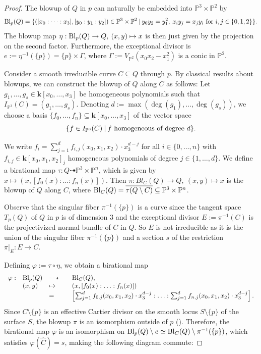 \documentclass[english,11pt,reqno]{amsart}
\newcommand{\sub}{\subseteq}
\newcommand{\Ptwo}{\mathbb{P}^2}
\newcommand{\Pthree}{\mathbb{P}^3}
\newcommand{\Pn}{\mathbb{P}^n}
\newcommand{\VPtwo}{V_{\Ptwo}}
\newcommand{\kk}{\mathbf{k}}
\newcommand{\kPthree}{\kk[x_0,\dots,x_3]}
\newcommand{\Bl}{\textup{Bl}}
\begin{document}
%
%
\begin{proof} The blowup of $Q$ in $p$ can naturally be embedded into $\Pthree \times \Ptwo$ by 
$$ \Bl_p(Q)=\{([x_0:\dots:x_3], [y_0:y_1:y_2])\in \Pthree \times \Ptwo \:|\: y_0y_2=y_1^2, \: x_iy_j=x_jy_i \textup{ for } i,j\in\{0,1,2\}\}.$$
The blowup map $\eta:\Bl_p(Q)\rightarrow Q,\: (x,y)\mapsto x$ is then just given by the projection on the second factor. Furthermore, the exceptional divisor is $e:=\eta^{-1}(\{p\})=\{p\} \times \Gamma$, where $\Gamma:=\VPtwo(x_0x_2-x_1^2)$ is a conic in $\Ptwo$.\par 
Consider a smooth irreducible curve $C\sub Q$ through $p$. By classical results about blowups, we can construct the blowup of $Q$ along $C$ as follows: Let $g_1,\dots, g_s \in \kPthree$ be homogeneous polynomials such that $I_{\Pthree}(C)=(g_1,\dots,g_s)$. Denoting $d:=\max(\deg(g_1),\dots,\deg(g_s))$, we choose a basis $\{f_0,\dots, f_n\}\sub\kPthree$ of the vector space $$\{f\in I_{\Pthree}(C) \:|\: f \textup{ homogeneous of degree } d\}.$$ \par 
We write $f_i=\sum_{j=1}^d f_{i,j}(x_0,x_1,x_2) \cdot x_3^{d-j}$ for all $i\in\{0,\dots,n\}$ with $f_{i,j}\in \kk[x_0,x_1,x_2]_j$ homogeneous polynomials of degree $j\in \{1,\dots,d\}$. We define a birational map $\tau: Q \dashrightarrow \Pthree \times \Pn$, which is given by
$x \mapsto (x,[f_0(x):{\dots }:f_n(x)]).$
Then $\pi:Bl_C(Q)\rightarrow Q, \:(x,y)\mapsto x$ is the blowup of $Q$ along $C$, where $\Bl_C(Q)= \overline{\tau(Q\setminus C)}\sub \Pthree\times \Pn$.\par 
Observe that the singular fiber $\pi^{-1}(\{p\})$ is a curve since the tangent space $T_p(Q)$ of $Q$ in $p$ is of dimension 3 and the exceptional divisor $E:=\pi^{-1}(C)$ is the projectivized normal bundle of $C$ in $Q$.
So $E$ is not irreducible as it is the union of the singular fiber $\pi^{-1}(\{p\})$ and a section $s$ of the restriction $\pi|_{E}:E \rightarrow C$. \par 
Defining $\varphi:= \tau \circ \eta$, we obtain a birational map
$$ \begin{array}{l l l l l}
\varphi:&\Bl_p(Q)&\dashrightarrow &&\Bl_C(Q), \\ 
&(x,y) &\mapsto &&(x,[f_0(x):{\dots}: f_n(x)])\\
& & =& & \left[\sum_{j=1}^d f_{0,j}(x_0,x_1,x_2)\cdot x_3^{d-j}: {\dots}: \sum_{j=1}^d f_{n,j}(x_0,x_1,x_2)\cdot x_3^{d-j} \right].
\end{array}$$ 
Since $C\setminus \{p\}$ is an effective Cartier divisor on the smooth locus $S\setminus \{p\}$ of the surface $S$, the blowup $\pi$ is an isomorphism outside of $p$ (). Therefore, the birational map $\varphi$ is an isomorphism on $\Bl_p(Q)\setminus e \simeq \Bl_C(Q)\setminus \pi^{-1}(\{p\})$, which satisfies $\varphi(\hat{C})=s$, making the following diagram commute: \par

\end{proof}
\end{document}
